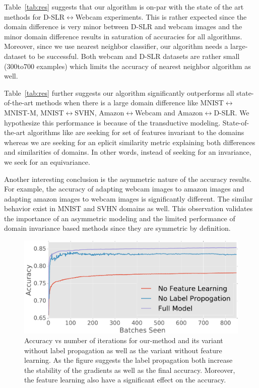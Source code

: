 Table~\ref{tab:res} suggests that our algorithm is on-par with the state of the art methods for D-SLR$\leftrightarrow$Webcam experiments. This is rather expected since the domain difference is very minor between D-SLR and webcam images and the minor domain difference results in saturation of accuracies for all algorithms. Moreover, since we use nearest neighbor classifier, our algorithm needs a large-dataset to be successful. Both webcam and D-SLR datasets are rather small (300to700 examples) which limits the accuracy of nearest neighbor algorithm as well.

Table~\ref{tab:res} further suggests our algorithm significantly outperforms all state-of-the-art methods when there is a large domain difference like MNIST$\leftrightarrow$MNIST-M, MNIST$\leftrightarrow$SVHN, Amazon$\leftrightarrow$Webcam and Amazon$\leftrightarrow$D-SLR. We hypothesize this performance is because of the transductive modeling. State-of-the-art algorithms like \cite{ganin15} are seeking for set of features invariant to the domains whereas we are seeking for an eplicit similarity metric explaining both differences and similarities of domains. In other words, instead of seeking for an invariance, we seek for an equivariance.

Another interesting conclusion is the asymmetric nature of the accuracy results. For example, the accuracy of adapting webcam images to amazon images and adapting amazon images to webcam images is significantly different. The similar behavior exist in MNIST and SVHN domains as well. This observation validates the importance of an asymmetric modeling and the limited performance of domain invariance based methods since they are symmetric by definition. 

\begin{figure}[ht]
\includegraphics[width=\columnwidth]{no_feature_propogation}
\caption{Accuracy vs number of iterations for our-method and its variant without label propagation as well as the variant without feature learning. As the figure suggests the label propagation both increase the stability of the gradients as well as the final accuracy. Moreover, the feature learning also have a significant effect on the accuracy.}
\label{fllprop}
\end{figure}

